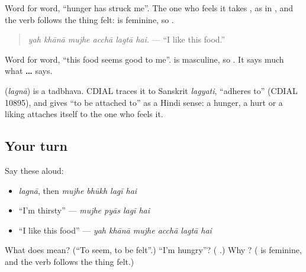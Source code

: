 Word for word, \textquotedblleft{}hunger has struck me\textquotedblright{}. The one who feels it takes \textbf{}, as in \textbf{  }, and the verb follows the thing felt: \textbf{} is feminine, so \textbf{}.

\begin{quote}
\textbf{     }
\end{quote}

\begin{quote}
\emph{yah khānā mujhe acchā lagtā hai.} — \textquotedblleft{}I like this food.\textquotedblright{}
\end{quote}

Word for word, \textquotedblleft{}this food seems good to me\textquotedblright{}. \textbf{} is masculine, so \textbf{}. It says much what \textbf{ …  } says.

\begin{cousinweb}
\textbf{} (\emph{lagnā}) is a tadbhava. CDIAL traces it to Sanskrit \emph{lagyati}, \textquotedblleft{}adheres to\textquotedblright{} (CDIAL 10895), and gives \textquotedblleft{}to be attached to\textquotedblright{} as a Hindi sense: a hunger, a hurt or a liking attaches itself to the one who feels it.
\end{cousinweb}

\subsection*{Your turn}
Say these aloud:

\begin{itemize}
\raggedright
  \item \emph{lagnā}, then \emph{mujhe bhūkh lagī hai}
  \item \textquotedblleft{}I'm thirsty\textquotedblright{} — \emph{mujhe pyās lagī hai}
  \item \textquotedblleft{}I like this food\textquotedblright{} — \emph{yah khānā mujhe acchā lagtā hai}
\end{itemize}

\begin{tcolorbox}[breakable,colback=teal!4,colframe=teal!35!black,title={Before you move on}]
What does \textbf{} mean? (\textquotedblleft{}To seem, to be felt\textquotedblright{}.) \textquotedblleft{}I'm hungry\textquotedblright{}? (\textbf{   }.) Why \textbf{}? (\textbf{} is feminine, and the verb follows the thing felt.)
\end{tcolorbox}
